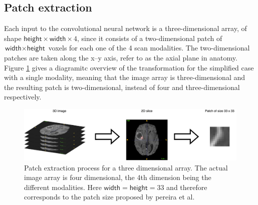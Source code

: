 \documentclass[12pt,a4paper,twoside,openright]{report}
\begin{document}
\subsection{Patch extraction}
\label{section:patch_extraction}
Each input to the convolutional neural network is a three-dimensional array, of shape $\textsf{height} \times \textsf{width} \times 4$, since it consists of a two-dimensional patch of $\textsf{width} \times \textsf{height}$ voxels for each one of the 4 scan modalities. The two-dimensional patches are taken along the x--y axis, refer to as the axial plane in anatomy. Figure \ref{fig:patch_extraction} gives a diagramitc overview of the transformation for the simplified case with a single modality, meaning that the image array is three-dimensional and the resulting patch is two-dimensional, instead of four and three-dimensional respectively.
\begin{figure}
	\centering
	\includegraphics[width=\textwidth]{patch_extraction}
	\caption[Patch extraction process for a three dimensional array.]{Patch extraction process for a three dimensional array. The actual image array is four dimensional, the 4th dimension being the different modalities. Here $\textsf{width}=\textsf{height}=33$ and therefore corresponds to the patch size proposed by pereira et al.}
	\label{fig:patch_extraction}
\end{figure}
\end{document}
